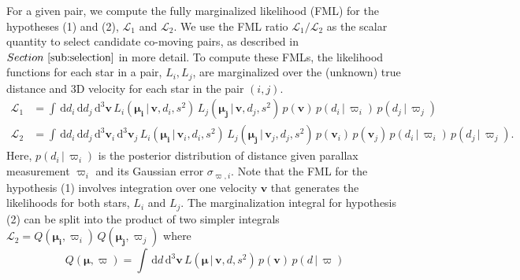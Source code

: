 \documentclass[manuscript, letterpaper]{aastex6}
\newcommand{\sectionname}{Section}
\newcommand{\given}{\,|\,}
\newcommand{\dd}{\mathrm{d}}
\newcommand{\bs}[1]{\boldsymbol{#1}}
\renewcommand{\vec}[1]{\bs{#1}}
\begin{document}
For a given pair, we compute the fully marginalized likelihood (FML) for the hypotheses (1) and (2),
$\mathcal{L}_1$ and $\mathcal{L}_2$.
We use the FML ratio $\mathcal{L}_1/\mathcal{L}_2$ as the scalar quantity to select
candidate co-moving pairs, as described in $\sectionname~\ref{sub:selection}$ in
more detail.
To compute these FMLs, the likelihood functions for each star in a pair, $L_i,
L_j$, are marginalized over the (unknown) true distance and 3D velocity for each star in
the pair $(i,j)$.
\begin{align}
  \mathcal{L}_1 &=
    \int \, \dd d_i \, \dd d_j \, \dd^3 \vec{v} \,
    L_i(\vec{\mu_i} \given \vec{v}, d_i, s^2) \,
    L_j(\vec{\mu_j} \given \vec{v}, d_j, s^2) \,
    p(\vec{v}) \, p(d_i \given \varpi_i) \, p(d_j \given \varpi_j) \\
  \mathcal{L}_2 &=
    \int \, \dd d_i \, \dd d_j \, \dd^3 \vec{v}_i \, \dd^3 \vec{v}_j \,
    L_i(\vec{\mu_i} \given \vec{v}_i, d_i, s^2) \,
    L_j(\vec{\mu_j} \given \vec{v}_j, d_j, s^2) \,
    p(\vec{v}_i) \, p(\vec{v}_j) \, p(d_i \given \varpi_i) \, p(d_j \given \varpi_j). \label{eq:hyp2}
\end{align}
Here, $p(d_i \given \varpi_i)$ is the posterior distribution of distance given parallax measurement
$\varpi_i$ and its Gaussian error $\sigma_{\varpi,i}$.
Note that the FML for the hypothesis (1) involves integration over one velocity $\vec{v}$ that
generates the likelihoods for both stars, $L_i$ and $L_j$.
The marginalization integral for hypothesis (2) can be split into the product of
two simpler integrals $\mathcal{L}_2 = Q(\vec{\mu_i}, \varpi_i) \, Q(\vec{\mu_j}, \varpi_j)$ where
\begin{equation}
  Q(\vec{\mu}, \varpi) = \int \, \dd d \, \dd^3 \vec{v} \, L(\vec{\mu} \given \vec{v}, d, s^2) \,
  p(\vec{v}) \, p(d \given \varpi)
\end{equation}
\end{document}
